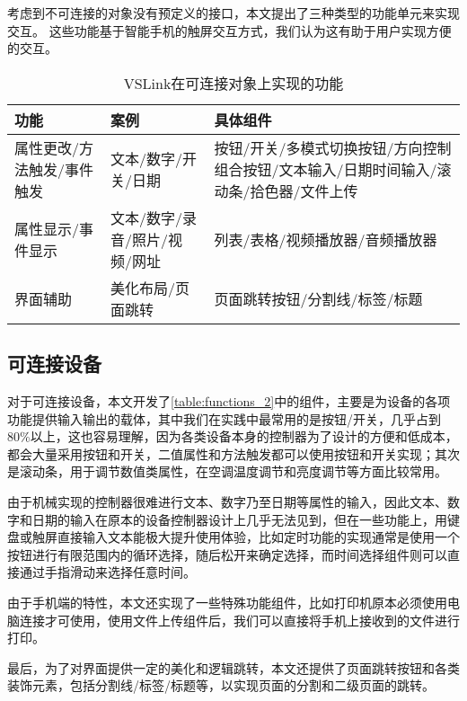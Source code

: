 考虑到不可连接的对象没有预定义的接口，本文提出了三种类型的功能单元来实现交互。
这些功能基于智能手机的触屏交互方式，我们认为这有助于用户实现方便的交互。

\vspace{-1em}
\begin{table}[htbp]
	\caption{VSLink在可连接对象上实现的功能}  \label{table:functions_2} 
	\begin{center}  
		\begin{tabular}{|m{2.2cm}<{\centering}|m{6cm}<{\centering}|m{6cm}<{\centering}|}  
			\hline  
			\textbf{功能} & \textbf{案例} &\textbf{具体组件}\\ \hline  
			属性更改/方法触发/事件触发 & 文本/数字/开关/日期 & 按钮/开关/多模式切换按钮/方向控制组合按钮/文本输入/日期时间输入/滚动条/拾色器/文件上传 \\ \hline 
			属性显示/事件显示 & 文本/数字/录音/照片/视频/网址 & 列表/表格/视频播放器/音频播放器  \\ \hline
			界面辅助 & 美化布局/页面跳转 & 页面跳转按钮/分割线/标签/标题 \\ \hline
		\end{tabular}  
	\end{center}  
\end{table}

\subsection{可连接设备}
对于可连接设备，本文开发了\autoref{table:functions_2}中的组件，主要是为设备的各项功能提供输入输出的载体，其中我们在实践中最常用的是按钮/开关，几乎占到80\%以上，这也容易理解，因为各类设备本身的控制器为了设计的方便和低成本，都会大量采用按钮和开关，二值属性和方法触发都可以使用按钮和开关实现；其次是滚动条，用于调节数值类属性，在空调温度调节和亮度调节等方面比较常用。

由于机械实现的控制器很难进行文本、数字乃至日期等属性的输入，因此文本、数字和日期的输入在原本的设备控制器设计上几乎无法见到，但在一些功能上，用键盘或触屏直接输入文本能极大提升使用体验，比如定时功能的实现通常是使用一个按钮进行有限范围内的循环选择，随后松开来确定选择，而时间选择组件则可以直接通过手指滑动来选择任意时间。

由于手机端的特性，本文还实现了一些特殊功能组件，比如打印机原本必须使用电脑连接才可使用，使用文件上传组件后，我们可以直接将手机上接收到的文件进行打印。

最后，为了对界面提供一定的美化和逻辑跳转，本文还提供了页面跳转按钮和各类装饰元素，包括分割线/标签/标题等，以实现页面的分割和二级页面的跳转。

